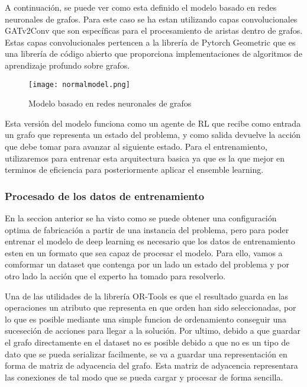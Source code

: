 A continuación, se puede ver como esta definido el modelo basado en redes neuronales de grafos.
Para este caso se ha estan utilizando capas convolucionales GATv2Conv que son específicas para
el procesamiento de aristas dentro de grafos. Estas capas convolucionales pertencen a la librería
de Pytorch Geometric \cite{pytorch-geometric} que es una librería de código abierto que proporciona
implementaciones de algoritmos de aprendizaje profundo sobre grafos. 

\begin{figure}[ht]
    \centering
    \texttt{[image: normalmodel.png]}
    \caption{Modelo basado en redes neuronales de grafos}
    \label{fig:basicmodel}
\end{figure}

Esta versión del modelo funciona como un agente de RL que recibe como entrada un grafo que representa
un estado del problema, y como salida devuelve la acción que debe tomar para avanzar al siguiente estado.
Para el entrenamiento, utilizaremos para entrenar esta arquitectura basica ya que es la que mejor
en terminos de eficiencia para posteriormente aplicar el ensemble learning.

\subsubsection{Procesado de los datos de entrenamiento}
En la seccion anterior se ha visto como se puede obtener una configuración optima de fabricación
a partir de una instancia del problema, pero para poder entrenar el modelo de deep learning es necesario
que los datos de entrenamiento esten en un formato que sea capaz de procesar el modelo. Para ello,
vamos a comformar un dataset que contenga por un lado un estado del problema y por otro lado la
acción que el experto ha tomado para resolverlo.\medskip

Una de las utilidades de la librería OR-Tools es que el resultado guarda en las operaciones
un atributo que representa en que orden han sido seleccionadas, por lo que es posible mediante 
una simple funcion de ordenamiento conseguir una suceseción de acciones para llegar a la solución.
Por ultimo, debido a que guardar el grafo directamente en el dataset no es posible debido a que
no es un tipo de dato que se pueda serializar facilmente, se va a guardar una representación en forma de
matriz de adyacencia del grafo. Esta matriz de adyacencia representara las conexiones de tal modo que 
se pueda cargar y procesar de forma sencilla.

